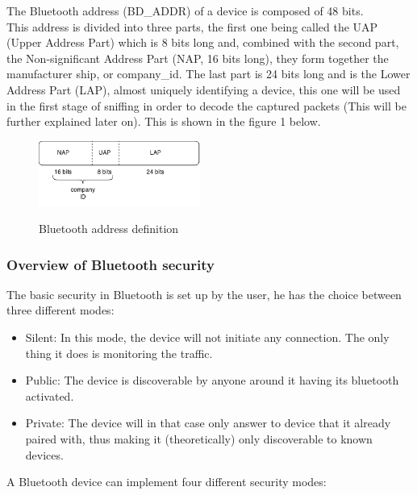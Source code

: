 The Bluetooth address (BD\_ADDR) of a device is composed of 48 bits. \\
This address is divided into three parts, the first one being called the UAP (Upper Address Part) which is 8 bits long and, combined with the second part, the Non-significant Address Part (NAP, 16 bits long), they form together the manufacturer ship, or company\_id. The last part is 24 bits long and is the Lower Address Part (LAP), almost uniquely identifying a device, this one will be used in the first stage of sniffing in order to decode the captured packets (This will be further explained later on). This is shown in the figure 1 below.\\


\begin{figure}[!h]
  \begin{center}
	\includegraphics[width=200px]{images/bd_addr.png}
	\label{Bluetooth address}
	\caption{Bluetooth address definition}
  \end{center}
\end{figure}
\newpage
\subsubsection{Overview of Bluetooth security}

The basic security in Bluetooth is set up by the user, he has the choice between three different modes:
\begin{itemize}[nolistsep,noitemsep]
 	\item Silent: In this mode, the device will not initiate any connection. The only thing it does is monitoring the traffic.
 	\item Public: The device is discoverable by anyone around it having its bluetooth activated.
 	\item Private: The device will in that case only answer to device that it already paired with, thus making it (theoretically) only discoverable to known devices.\\
\end{itemize}

\noindent A Bluetooth device can implement four different security modes:

